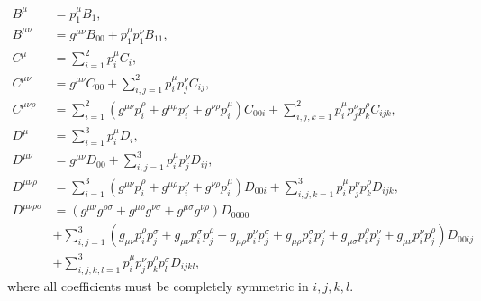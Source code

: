 \documentclass[../main.tex]{subfiles}
\begin{document}
\begin{subequations}
    \begin{align}
        B^\mu                & = p_1^\mu B_1,
        \\
        B^{\mu\nu}           & = g^{\mu\nu} B_{00} + p_1^\mu p_1^\nu B_{11},
        \\
        C^\mu                & = \sum_{i=1}^2 p_i^\mu C_i,
        \\
        C^{\mu\nu}           & = g^{\mu\nu} C_{00} + \sum_{i,j=1}^{2} p_i^\mu
        p_j^\nu C_{ij},
        \\
        C^{\mu\nu\rho}       & = \sum_{i=1}^2 (g^{\mu\nu} p_i^{\rho} +
        g^{\mu\rho} p_i^{\nu} + g^{\nu\rho} p_i^{\mu}) C_{00i} +
        \sum_{i,j,k=1}^2
        p_i^\mu p_j^\nu p_k^\rho C_{ijk},
        \\
        D^\mu                & = \sum_{i=1}^3 p_i^\mu D_i,
        \\
        D^{\mu\nu}           & = g^{\mu\nu} D_{00} + \sum_{i,j=1}^{3} p_i^\mu
        p_j^\nu D_{ij},
        \\
        D^{\mu\nu\rho}       & = \sum_{i=1}^3 (g^{\mu\nu} p_i^{\rho} +
        g^{\mu\rho} p_i^{\nu} + g^{\nu\rho} p_i^{\mu}) D_{00i} +
        \sum_{i,j,k=1}^3
        p_i^\mu p_j^\nu p_k^\rho D_{ijk},
        \\
        \nonumber
        D^{\mu\nu\rho\sigma} & = (g^{\mu\nu}g^{\rho\sigma} +
        g^{\mu\rho}g^{\nu\sigma} + g^{\mu\sigma}g^{\nu\rho})D_{0000}
        \\
        \nonumber
                             & + \sum_{i,j=1}^3 (g_{\mu\nu}p_i^\rho p_j^\sigma
        + g_{\mu\nu}p_i^\sigma p_j^\rho + g_{\mu\rho}p_i^\nu p_j^\sigma +
        g_{\mu\rho}p_i^\sigma p_j^\nu + g_{\mu\sigma}p_i^\rho p_j^\nu +
        g_{\mu\nu}p_i^\nu p_j^\rho) D_{00ij}
        \\
                             & + \sum_{i,j,k,l=1}^3 p_i^\mu p_j^\nu p_k^\rho
        p_l^\sigma D_{ijkl},
    \end{align}
\end{subequations}
where all coefficients must be completely symmetric in \(i,j,k,l\).
\end{document}
